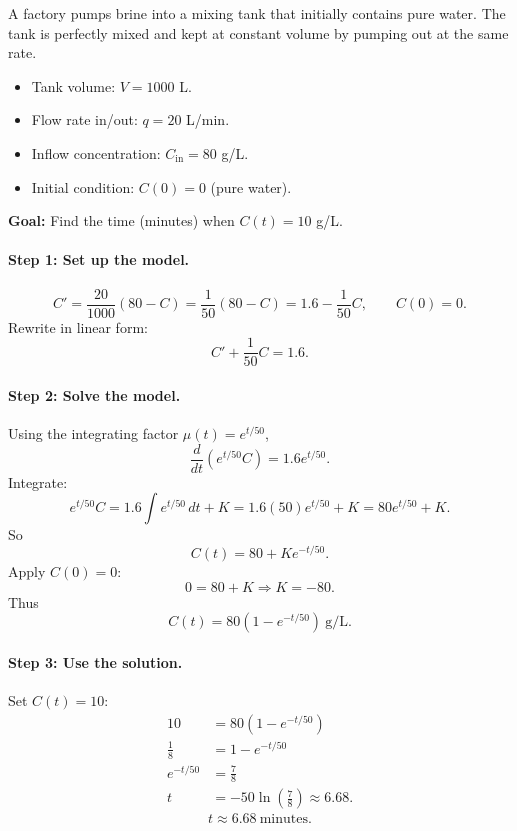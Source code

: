 \documentclass[09pt,letterpaper]{article}
\begin{document}
\begin{example}[2]{

A factory pumps brine into a mixing tank that initially contains pure water. The tank is perfectly mixed and kept at constant volume by pumping out at the same rate.

\begin{itemize}
    \item Tank volume: $V=1000$ L.
    \item Flow rate in/out: $q=20$ L/min.
    \item Inflow concentration: $C_{\text{in}}=80$ g/L.
    \item Initial condition: $C(0)=0$ (pure water).
\end{itemize}
\textbf{Goal:} Find the time (minutes) when $C(t)=10$ g/L.
}


\paragraph{Step 1: Set up the model.}
\[
C'=\frac{20}{1000}(80-C)=\frac{1}{50}(80-C)
=1.6-\frac{1}{50}C,
\qquad
C(0)=0.
\]
Rewrite in linear form:
\[
C' + \frac{1}{50}C = 1.6.
\]

\paragraph{Step 2: Solve the model.}
Using the integrating factor $\mu(t)=e^{t/50}$,
\[
\frac{d}{dt}\left(e^{t/50}C\right)=1.6e^{t/50}.
\]
Integrate:
\[
e^{t/50}C = 1.6\int e^{t/50}\,dt + K
=1.6(50)e^{t/50}+K
=80e^{t/50}+K.
\]
So
\[
C(t)=80+Ke^{-t/50}.
\]
Apply $C(0)=0$:
\[
0=80+K \Rightarrow K=-80.
\]
Thus
\[
\boxed{
C(t)=80\left(1-e^{-t/50}\right)\ \text{g/L}.
}
\]

\paragraph{Step 3: Use the solution.}
Set $C(t)=10$:
\begin{align*}
10 &= 80\left(1-e^{-t/50}\right)\\
\frac{1}{8} &= 1-e^{-t/50}\\
e^{-t/50} &= \frac{7}{8}\\
t &= -50\ln\left(\frac{7}{8}\right)\approx 6.68.
\end{align*}
\[
\boxed{t \approx 6.68\ \text{minutes}.}
\]
\end{example}

\end{document}
